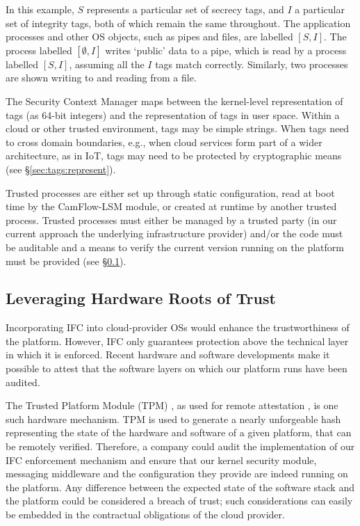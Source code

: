 \documentclass[10pt,journal,compsoc]{IEEEtran}
\begin{document}
In this example, $S$ represents a particular set of secrecy tags, and $I$  a particular set of integrity tags, both of which remain the same throughout. 
The application processes and other OS objects, such as pipes and files, are labelled $[S,I]$. The process labelled $[\emptyset,I]$ writes `public' data to a pipe, which is read by a process labelled $[S,I]$, assuming all the $I$ tags match correctly. 
Similarly, two processes are shown writing to and reading from a file.


The Security Context Manager maps between the kernel-level representation of tags (as 64-bit integers) and the representation of tags in user space. 
Within a cloud or other trusted environment, tags may be simple strings. When tags need to cross domain boundaries, e.g., when cloud services form part of a wider architecture, as in IoT, tags may need to be protected by cryptographic means (see \S\ref{sec:tags:represent}).

Trusted processes are either set up through static configuration, read at boot time by the CamFlow-LSM module, or created at runtime by another trusted process.
Trusted processes must either be managed by a trusted party (in our current approach the underlying infrastructure provider) and\slash or the code must be auditable and a means to verify the current version running on the platform must be provided (see \S\ref{sec:os:hardware}).







\subsection{Leveraging Hardware Roots of Trust}
\label{sec:os:hardware}

Incorporating IFC into cloud-provider OSs would enhance the trustworthiness of the platform. However, IFC only guarantees protection above the technical layer in which it is enforced. 
Recent hardware and software developments make it possible to attest that the software layers on which our platform runs have been audited.

The Trusted Platform Module (TPM) \cite{parno2008bootstrapping}, as used for remote attestation \cite{santos2009towards}, is one such hardware mechanism. 
TPM is used to generate a nearly unforgeable hash representing the state of the hardware and software of a given platform, that can be remotely verified.
Therefore, a company could audit the implementation of our IFC enforcement mechanism and ensure that our kernel security module, messaging middleware and the configuration they provide are indeed running on the platform. 
Any difference between the expected state of the software stack and the platform could be considered a breach of trust; such considerations can easily be embedded in the contractual obligations of the cloud provider.
\end{document}
